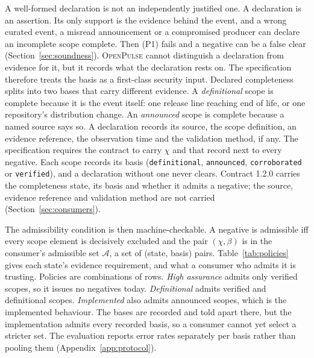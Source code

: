 \documentclass[11pt,a4paper]{article}
\newcommand{\op}{\textsc{OpenPulse}}
\newcommand{\code}[1]{\texttt{#1}}
\begin{document}
A well-formed declaration is not an independently justified one. A
declaration is an assertion. Its only support is the evidence behind
the event, and a wrong curated event, a misread announcement or a
compromised producer can declare an incomplete scope complete. Then
(P1) fails and a negative can be a false clear (Section~\ref{sec:soundness}).
\op{} cannot distinguish a declaration from evidence for it, but it
records what the declaration rests on. The specification therefore treats the basis as a
first-class security input. Declared completeness splits into two
bases that carry different evidence. A \emph{definitional} scope is
complete because it is the event itself: one release line reaching end
of life, or one repository's distribution change. An \emph{announced}
scope is complete because a named source says so. A declaration
records its source, the scope definition, an evidence reference, the
observation time and the validation method, if any. The specification
requires the contract to carry $\chi$ and that record next to every
negative. Each scope records its basis (\code{definitional},
\code{announced}, \code{corroborated} or \code{verified}), and a
declaration without one never clears. Contract 1.2.0 carries the
completeness state, its basis and whether it admits a negative; the
source, evidence reference and validation method are not carried
(Section~\ref{sec:consumers}).

The admissibility condition is then machine-checkable. A negative is
admissible iff every scope element is decisively excluded and the pair
$(\chi, \beta)$ is in the consumer's admissible set $\mathcal{A}$, a
set of (state, basis) pairs.
Table~\ref{tab:policies} gives each state's evidence requirement, and
what a consumer who admits it is trusting. Policies are combinations
of rows. \emph{High assurance} admits only verified scopes, so it
issues no negatives today. \emph{Definitional} admits verified and
definitional scopes. \emph{Implemented} also admits announced scopes,
which is the implemented behaviour. The bases are recorded and told
apart there, but the implementation admits every recorded basis, so a
consumer cannot yet select a stricter set. The evaluation reports error rates separately per
basis rather than pooling them (Appendix~\ref{app:protocol}).
\end{document}
